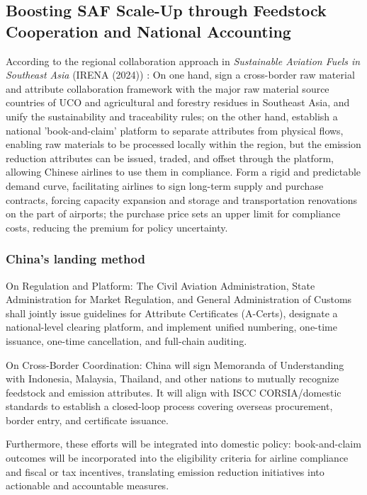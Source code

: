 \documentclass[a4paper,11pt]{article}
\begin{document}
\subsection{Boosting SAF Scale-Up through Feedstock Cooperation and National Accounting}
According to the regional collaboration approach in \textit{Sustainable Aviation Fuels in Southeast Asia} (IRENA (2024)) \cite{irena2024}: On one hand, sign a cross-border raw material and attribute collaboration framework with the major raw material source countries of UCO and agricultural and forestry residues in Southeast Asia, and unify the sustainability and traceability rules; on the other hand, establish a national 'book-and-claim' platform to separate attributes from physical flows, enabling raw materials to be processed locally within the region, but the emission reduction attributes can be issued, traded, and offset through the platform, allowing Chinese airlines to use them in compliance. Form a rigid and predictable demand curve, facilitating airlines to sign long-term supply and purchase contracts, forcing capacity expansion and storage and transportation renovations on the part of airports; the purchase price sets an upper limit for compliance costs, reducing the premium for policy uncertainty.

\subsubsection{China's landing method}
On Regulation and Platform: The Civil Aviation Administration, State Administration for Market Regulation, and General Administration of Customs shall jointly issue guidelines for Attribute Certificates (A-Certs), designate a national-level clearing platform, and implement unified numbering, one-time issuance, one-time cancellation, and full-chain auditing.

On Cross-Border Coordination: China will sign Memoranda of Understanding with Indonesia, Malaysia, Thailand, and other nations to mutually recognize feedstock and emission attributes. It will align with ISCC CORSIA/domestic standards to establish a closed-loop process covering overseas procurement, border entry, and certificate issuance.

Furthermore, these efforts will be integrated into domestic policy: book-and-claim outcomes will be incorporated into the eligibility criteria for airline compliance and fiscal or tax incentives, translating emission reduction initiatives into actionable and accountable measures.
\end{document}
